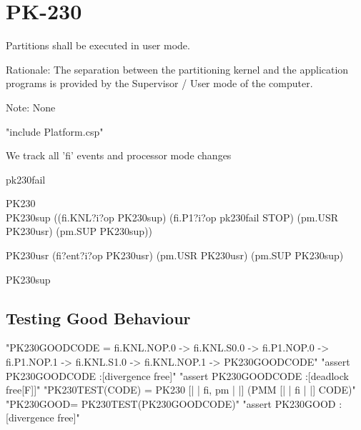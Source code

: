 \section{PK-230} %

       Partitions shall be executed in user mode.

  Rationale: The separation between the partitioning kernel and the application
  programs is provided by the Supervisor / User mode of the computer.

  Note: None


\begin{assert} "include Platform.csp" \end{assert}

We track all 'fi' events and processor mode changes

\begin{circus}
\circchannel pk230fail

\circprocess PK230 \circdef \circbegin\\ %

PK230sup
 \circdef  ((fi.KNL?i?op \then PK230sup)
    \extchoice
    (fi.P1?i?op \then pk230fail \then STOP)
    \extchoice
    (pm.USR \then PK230usr)
    \extchoice
    (pm.SUP \then PK230sup))

PK230usr
 \circdef  (fi?ent?i?op \then PK230usr)
    \extchoice
    (pm.USR \then PK230usr)
    \extchoice
    (pm.SUP \then PK230sup)

  \circspot PK230sup\\
\circend
\end{circus}

\subsection{Testing Good Behaviour}

\begin{assert}
"PK230GOODCODE = fi.KNL.NOP.0 -> fi.KNL.S0.0  -> fi.P1.NOP.0  -> fi.P1.NOP.1  -> fi.KNL.S1.0  -> fi.KNL.NOP.1 -> PK230GOODCODE"
\also "assert PK230GOODCODE :[divergence free]"
\also "assert PK230GOODCODE :[deadlock free[F]]"
\also "PK230TEST(CODE) = PK230 [| {| fi, pm |} |] (PMM [| {| fi |} |] CODE)"
\also "PK230GOOD= PK230TEST(PK230GOODCODE)"
\also "assert PK230GOOD :[divergence free]"
\end{assert}

